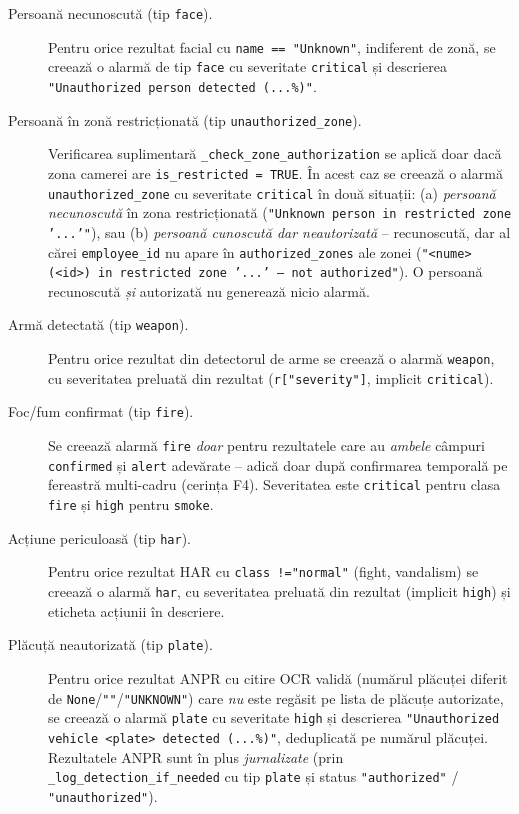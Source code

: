 \documentclass[../../main.tex]{subfiles}
\begin{document}
\begin{description}
    \item[Persoană necunoscută (tip \texttt{face}).] Pentru orice rezultat facial cu \texttt{name == \linebreak "Unknown"}, indiferent de zonă, se creează o alarmă de tip \texttt{face} cu severitate \texttt{critical} și descrierea \texttt{"Unauthorized person detected (...\%)"}.

    \item[Persoană în zonă restricționată (tip \texttt{unauthorized\_zone}).] Verificarea suplimentară \texttt{\_check\_zone\_authorization} se aplică doar dacă zona camerei are \texttt{is\_restricted = TRUE}. În acest caz se creează o alarmă \linebreak \texttt{unauthorized\_zone} cu severitate \texttt{critical} în două situații: (a) \emph{persoană necunoscută} în zona restricționată (\texttt{"Unknown person in \linebreak restricted zone '...'"}), sau (b) \emph{persoană cunoscută dar neautorizată} -- recunoscută, dar al cărei \texttt{employee\_id} nu apare în \texttt{authorized\_\linebreak zones} ale zonei (\texttt{"<nume> (<id>) in restricted zone '...' --- not authorized"}). O persoană recunoscută \emph{și} autorizată nu generează nicio alarmă.

    \item[Armă detectată (tip \texttt{weapon}).] Pentru orice rezultat din detectorul de arme se creează o alarmă \texttt{weapon}, cu severitatea preluată din rezultat \linebreak (\texttt{r["severity"]}, implicit \texttt{critical}).

    \item[Foc/fum confirmat (tip \texttt{fire}).] Se creează alarmă \texttt{fire} \emph{doar} pentru rezultatele care au \emph{ambele} câmpuri \texttt{confirmed} și \texttt{alert} adevărate -- adică doar după confirmarea temporală pe fereastră multi-cadru (cerința F4). Severitatea este \texttt{critical} pentru clasa \texttt{fire} și \texttt{high} pentru \texttt{smoke}.

    \item[Acțiune periculoasă (tip \texttt{har}).] Pentru orice rezultat HAR cu \texttt{class !=\linebreak "normal"} (fight, vandalism) se creează o alarmă \texttt{har}, cu severitatea preluată din rezultat (implicit \texttt{high}) și eticheta acțiunii în descriere.

    \item[Plăcuță neautorizată (tip \texttt{plate}).] Pentru orice rezultat ANPR cu citire OCR validă (numărul plăcuței diferit de \texttt{None}/\texttt{""}/\texttt{"UNKNOWN"}) care \emph{nu} este regăsit pe lista de plăcuțe autorizate, se creează o alarmă \texttt{plate} cu severitate \texttt{high} și descrierea \texttt{"Unauthorized vehicle <plate> detected (...\%)"}, deduplicată pe numărul plăcuței. Rezultatele ANPR sunt în plus \emph{jurnalizate} (prin \texttt{\_log\_detection\_if\_needed} cu tip \texttt{plate} și status \texttt{"authorized"} / \texttt{"unauthorized"}).
\end{description}
\end{document}
